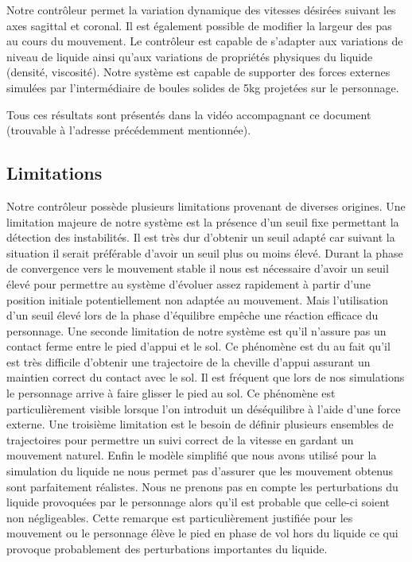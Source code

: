 \documentclass[runningheads,a4paper]{llncs}
\begin{document}
Notre contrôleur permet la variation dynamique des vitesses désirées suivant les axes sagittal et coronal. Il est également possible de modifier la largeur des pas au cours du mouvement.
Le contrôleur est capable de s'adapter aux variations de niveau de liquide ainsi qu'aux variations de propriétés physiques du liquide (densité, viscosité). Notre système est capable de supporter des forces externes simulées par l'intermédiaire de boules solides de 5kg projetées sur le personnage.

Tous ces résultats sont présentés dans la vidéo accompagnant ce document (trouvable à l'adresse précédemment mentionnée). 


\subsection{Limitations}
Notre contrôleur possède plusieurs limitations provenant de diverses origines. Une limitation majeure de notre système est la présence d'un seuil fixe permettant la détection des instabilités. Il est très dur d'obtenir un seuil adapté car suivant la situation il serait préférable d'avoir un seuil plus ou moins élevé. Durant la phase de convergence vers le mouvement stable il nous est nécessaire d'avoir un seuil élevé pour permettre au système d'évoluer assez rapidement à partir d'une position initiale potentiellement non adaptée au mouvement. Mais l'utilisation d'un seuil élevé lors de la phase d'équilibre empêche  une réaction efficace du personnage. 
Une seconde limitation de notre système est qu'il n'assure pas un contact ferme entre le pied d'appui et le sol. Ce phénomène est du au fait qu'il est très difficile d'obtenir une trajectoire de la cheville d'appui assurant un maintien correct du contact avec le sol. Il est fréquent que lors de nos simulations le personnage arrive à faire glisser le pied au sol. Ce phénomène est particulièrement visible lorsque l'on introduit un déséquilibre à l'aide d'une force externe. 
Une troisième limitation est le besoin de définir plusieurs ensembles de trajectoires pour permettre un suivi correct de la vitesse en gardant un mouvement naturel. 
Enfin le modèle simplifié que nous avons utilisé pour la simulation du liquide ne nous permet pas d'assurer que les mouvement obtenus sont parfaitement réalistes. Nous ne prenons pas en compte les perturbations du liquide provoquées par le personnage alors qu'il est probable que celle-ci soient non négligeables. Cette remarque est particulièrement justifiée pour les mouvement ou le personnage élève le pied en phase de vol hors du liquide ce qui provoque probablement des perturbations importantes du liquide.
\end{document}
